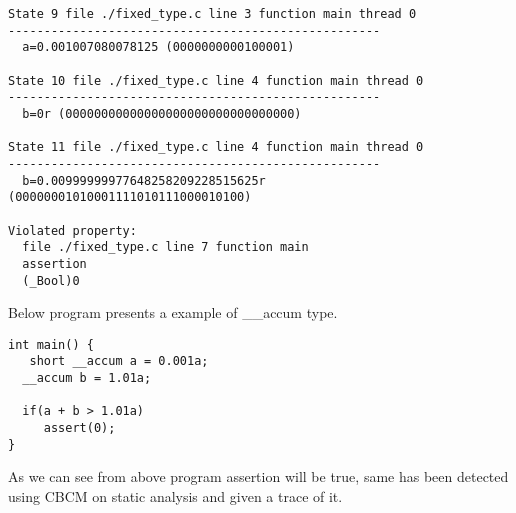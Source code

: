 \begin{lstlisting}
State 9 file ./fixed_type.c line 3 function main thread 0
----------------------------------------------------
  a=0.001007080078125 (0000000000100001)

State 10 file ./fixed_type.c line 4 function main thread 0
----------------------------------------------------
  b=0r (00000000000000000000000000000000)

State 11 file ./fixed_type.c line 4 function main thread 0
----------------------------------------------------
  b=0.00999999977648258209228515625r (00000001010001111010111000010100)

Violated property:
  file ./fixed_type.c line 7 function main
  assertion
  (_Bool)0
\end{lstlisting}

Below program presents a example of \_\_accum type.

\begin{lstlisting}
int main() {
   short __accum a = 0.001a;
  __accum b = 1.01a;

  if(a + b > 1.01a)
     assert(0);
}
\end{lstlisting}

As we can see from above program assertion will be true, same has been detected using CBCM on static analysis and given a trace of it.

